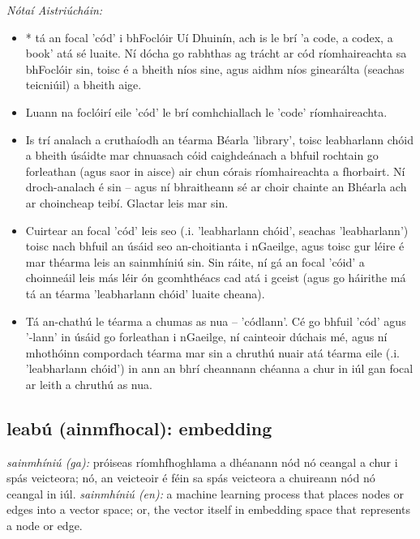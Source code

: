 \documentclass{article}
\begin{document}
 \noindent \textit{Nótaí Aistriúcháin:}
\begin{itemize}
	\item * tá an focal 'cód' i bhFoclóir Uí Dhuinín, ach is le brí 'a code, a codex, a book' atá sé luaite. Ní dócha go rabhthas ag trácht ar cód ríomhaireachta sa bhFoclóir sin, toisc é a bheith níos sine, agus aidhm níos ginearálta (seachas teicniúil) a bheith aige.
	\item Luann na foclóirí eile 'cód' le brí comhchiallach le 'code' ríomhaireachta.
	\item Is trí analach a cruthaíodh an téarma Béarla 'library', toisc leabharlann chóid a bheith úsáidte mar chnuasach cóid caighdeánach a bhfuil rochtain go forleathan (agus saor in aisce) air chun córais ríomhaireachta a fhorbairt. Ní droch-analach é sin -- agus ní bhraitheann sé ar choir chainte an Bhéarla ach ar choincheap teibí. Glactar leis mar sin.
	\item Cuirtear an focal 'cód' leis seo (.i. 'leabharlann chóid', seachas 'leabharlann') toisc nach bhfuil an úsáid seo an-choitianta i nGaeilge, agus toisc gur léire é mar théarma leis an sainmhíniú sin. Sin ráite, ní gá an focal 'cóid' a choinneáil leis más léir ón gcomhthéacs cad atá i gceist (agus go háirithe má tá an téarma 'leabharlann chóid' luaite cheana).
	\item Tá an-chathú le téarma a chumas as nua -- 'códlann'. Cé go bhfuil 'cód' agus '-lann' in úsáid go forleathan i nGaeilge, ní cainteoir dúchais mé, agus ní mhothóinn compordach téarma mar sin a chruthú nuair atá téarma eile (.i. 'leabharlann chóid') in ann an bhrí cheannann chéanna a chur in iúl gan focal ar leith a chruthú as nua.
\end{itemize}


\subsection*{leabú (ainmfhocal): embedding} 
 \noindent \textit{sainmhíniú (ga):} próiseas ríomhfhoghlama a dhéanann nód nó ceangal a chur i spás veicteora; nó, an veicteoir é féin sa spás veicteora a chuireann nód nó ceangal in iúl.
\newline\newline
 \noindent \textit{sainmhíniú (en):} a machine learning process that places nodes or edges into a vector space; or, the vector itself in embedding space that represents a node or edge.
\newline
\end{document}
